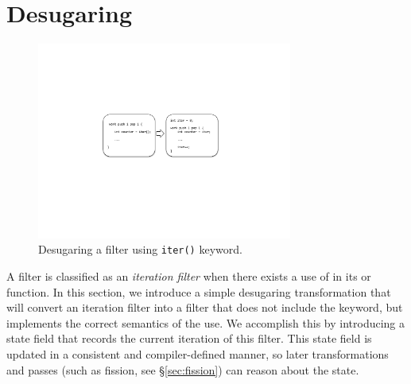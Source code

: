 \section{Desugaring}
\label{sec:desugar}

%
%
%
%
%
%
%
%
%
%


\begin{figure}[t!]
\centering
\includegraphics[width=3.3in]{figures/desugaring_filters.pdf} 
\caption{Desugaring a filter using \texttt{iter()} keyword.\protect\label{fig:desugar}}
\end{figure}


A filter is classified as an {\it iteration filter} when there exists a use of
\iter in its \prework or \work function.  In this section, we
introduce a simple desugaring transformation that will convert an
iteration filter into a filter that does not include the \iter
keyword, but implements the correct semantics of the \iter use.  We
accomplish this by introducing a state field that records the current
iteration of this filter.  This state field is updated in a consistent
and compiler-defined manner, so later transformations and passes (such
as fission, see \S\ref{sec:fission}) can reason about the
state.  

